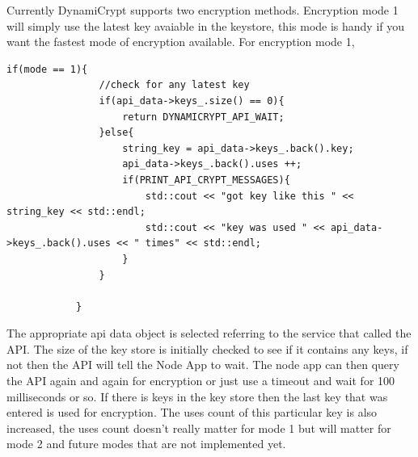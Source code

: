 Currently DynamiCrypt supports two encryption methods. Encryption mode 1 will simply use the latest key avaiable in the keystore, this mode is handy if you want the fastest mode of encryption available.
For encryption mode 1, 
\begin{lstlisting}
if(mode == 1){
                //check for any latest key 
                if(api_data->keys_.size() == 0){
                    return DYNAMICRYPT_API_WAIT;
                }else{
                    string_key = api_data->keys_.back().key;
                    api_data->keys_.back().uses ++;
                    if(PRINT_API_CRYPT_MESSAGES){
                        std::cout << "got key like this " << string_key << std::endl;
                        std::cout << "key was used " << api_data->keys_.back().uses << " times" << std::endl;
                    }
                }
            
            }
\end{lstlisting} 
The appropriate api data object is selected referring to the service that called the API.
The size of the key store is initially checked to see if it contains any keys, if not then the API will tell the Node App to wait. The node app can then query the API again and again for encryption or just use a timeout and wait for 100 milliseconds or so. 
If there is keys in the key store then the last key that was entered is used for encryption. The uses count of this particular key is also increased, the uses count doesn't really matter for mode 1 but will matter for mode 2 and future modes that are not implemented yet. 


